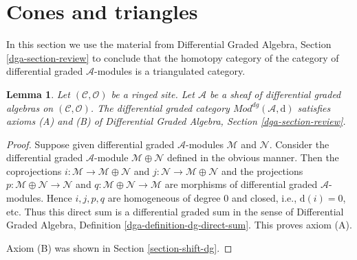 \documentclass{stacks-project}
\theoremstyle{plain}
\newtheorem{lemma}[subsection]{Lemma}
\theoremstyle{definition}
\theoremstyle{remark}
\numberwithin{equation}{subsection}
\begin{document}
\section{Cones and triangles}
\label{section-conclude-triangulated}

\noindent
In this section we use the material from
Differential Graded Algebra, Section \ref{dga-section-review}
to conclude that the homotopy category of the
category of differential graded $\mathcal{A}$-modules
is a triangulated category.

\begin{lemma}
\label{lemma-axioms-AB}
Let $(\mathcal{C}, \mathcal{O})$ be a ringed site.
Let $\mathcal{A}$ be a sheaf of differential graded algebras
on $(\mathcal{C}, \mathcal{O})$.
The differential graded category
$\textit{Mod}^{dg}(\mathcal{A}, \text{d})$
satisfies axioms (A) and (B) of
Differential Graded Algebra, Section \ref{dga-section-review}.
\end{lemma}

\begin{proof}
Suppose given differential graded $\mathcal{A}$-modules
$\mathcal{M}$ and $\mathcal{N}$. Consider the
differential graded $\mathcal{A}$-module $\mathcal{M} \oplus \mathcal{N}$
defined in the obvious manner. Then the coprojections
$i : \mathcal{M} \to \mathcal{M} \oplus \mathcal{N}$ and
$j : \mathcal{N} \to \mathcal{M} \oplus \mathcal{N}$ and the
projections
$p : \mathcal{M} \oplus \mathcal{N} \to \mathcal{N}$ and
$q : \mathcal{M} \oplus \mathcal{N} \to \mathcal{M}$
are morphisms of differential graded $\mathcal{A}$-modules.
Hence $i, j, p, q$ are homogeneous
of degree $0$ and closed, i.e., $\text{d}(i) = 0$, etc.
Thus this direct sum is a differential graded sum in the sense of
Differential Graded Algebra, Definition \ref{dga-definition-dg-direct-sum}.
This proves axiom (A).

\medskip\noindent
Axiom (B) was shown in Section \ref{section-shift-dg}.
\end{proof}
\end{document}
